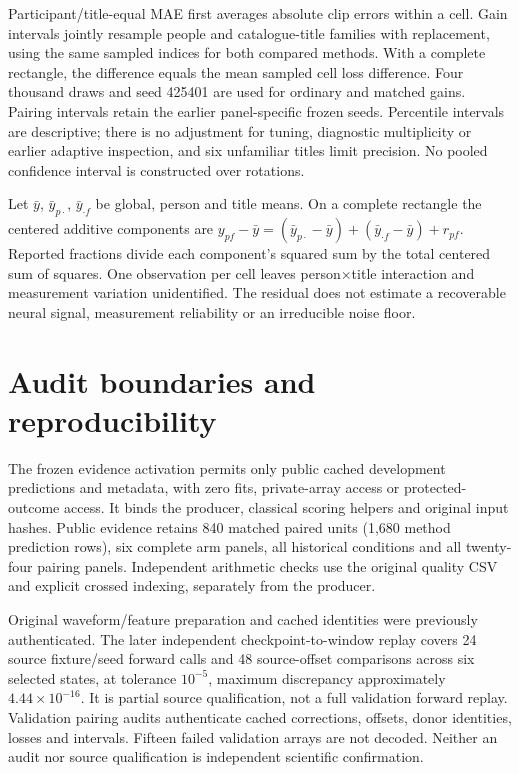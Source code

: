 \documentclass[10pt,a4paper]{article}
\begin{document}
Participant/title-equal MAE first averages absolute clip errors within a cell. Gain intervals jointly resample people and catalogue-title families with replacement, using the same sampled indices for both compared methods. With a complete rectangle, the difference equals the mean sampled cell loss difference. Four thousand draws and seed 425401 are used for ordinary and matched gains. Pairing intervals retain the earlier panel-specific frozen seeds. Percentile intervals are descriptive; there is no adjustment for tuning, diagnostic multiplicity or earlier adaptive inspection, and six unfamiliar titles limit precision. No pooled confidence interval is constructed over rotations.

Let \(\bar y\), \(\bar y_{p\cdot}\), \(\bar y_{\cdot f}\) be global, person and title means. On a complete rectangle the centered additive components are \(y_{pf}-\bar y=(\bar y_{p\cdot}-\bar y)+(\bar y_{\cdot f}-\bar y)+r_{pf}\). Reported fractions divide each component's squared sum by the total centered sum of squares. One observation per cell leaves person\(\times\)title interaction and measurement variation unidentified. The residual does not estimate a recoverable neural signal, measurement reliability or an irreducible noise floor.

\section{Audit boundaries and reproducibility}
The frozen evidence activation permits only public cached development predictions and metadata, with zero fits, private-array access or protected-outcome access. It binds the producer, classical scoring helpers and original input hashes. Public evidence retains 840 matched paired units (1,680 method prediction rows), six complete arm panels, all historical conditions and all twenty-four pairing panels. Independent arithmetic checks use the original quality CSV and explicit crossed indexing, separately from the producer.

Original waveform/feature preparation and cached identities were previously authenticated. The later independent checkpoint-to-window replay covers 24 source fixture/seed forward calls and 48 source-offset comparisons across six selected states, at tolerance \(10^{-5}\), maximum discrepancy approximately \(4.44\times10^{-16}\). It is partial source qualification, not a full validation forward replay. Validation pairing audits authenticate cached corrections, offsets, donor identities, losses and intervals. Fifteen failed validation arrays are not decoded. Neither an audit nor source qualification is independent scientific confirmation.
\end{document}
